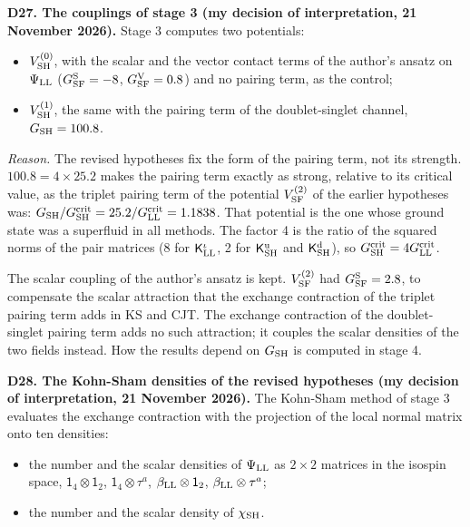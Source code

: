 \documentclass[
  10pt,
]{article}
\providecommand{\tightlist}{%
  \setlength{\itemsep}{0pt}\setlength{\parskip}{0pt}}
\begin{document}
\textbf{D27. The couplings of stage 3 (my decision of interpretation, 21
November 2026).} Stage 3 computes two potentials:

\begin{itemize}
\tightlist
\item
  \(V^{(0)}_{\rm SH}\), with the scalar and the vector contact terms of
  the author's ansatz on \(\Psi_{\rm LL}\) (\(G^{\rm S}_{\rm SF}=-8\),
  \(G^{\rm V}_{\rm SF}=0.8\)) and no pairing term, as the control;
\item
  \(V^{(1)}_{\rm SH}\), the same with the pairing term of the
  doublet-singlet channel, \(G_{\rm SH}=100.8\).
\end{itemize}

\emph{Reason.} The revised hypotheses fix the form of the pairing term,
not its strength. \(100.8=4\times25.2\) makes the pairing term exactly
as strong, relative to its critical value, as the triplet pairing term
of the potential \(V^{(2)}_{\rm SF}\) of the earlier hypotheses was:
\(G_{\rm SH}/G^{\rm crit}_{\rm SH}=25.2/G^{\rm crit}_{\rm LL}=1.1838\).
That potential is the one whose ground state was a superfluid in all
methods. The factor 4 is the ratio of the squared norms of the pair
matrices (8 for \(\mathsf K^\iota_{\rm LL}\), 2 for
\(\mathsf K^{\rm u}_{\rm SH}\) and \(\mathsf K^{\rm d}_{\rm SH}\)), so
\(G^{\rm crit}_{\rm SH}=4G^{\rm crit}_{\rm LL}\).

The scalar coupling of the author's ansatz is kept. \(V^{(2)}_{\rm SF}\)
had \(G^{\rm S}_{\rm SF}=2.8\), to compensate the scalar attraction that
the exchange contraction of the triplet pairing term adds in KS and CJT.
The exchange contraction of the doublet-singlet pairing term adds no
such attraction; it couples the scalar densities of the two fields
instead. How the results depend on \(G_{\rm SH}\) is computed in stage
4.

\textbf{D28. The Kohn-Sham densities of the revised hypotheses (my
decision of interpretation, 21 November 2026).} The Kohn-Sham method of
stage 3 evaluates the exchange contraction with the projection of the
local normal matrix onto ten densities:

\begin{itemize}
\tightlist
\item
  the number and the scalar densities of \(\Psi_{\rm LL}\) as
  \(2\times2\) matrices in the isospin space,
  \(\mathsf 1_4\otimes\mathsf 1_2\), \(\mathsf 1_4\otimes\tau^a\),
  \(\beta_{\rm LL}\otimes\mathsf 1_2\), \(\beta_{\rm LL}\otimes\tau^a\);
\item
  the number and the scalar density of \(\chi_{\rm SH}\).
\end{itemize}
\end{document}
